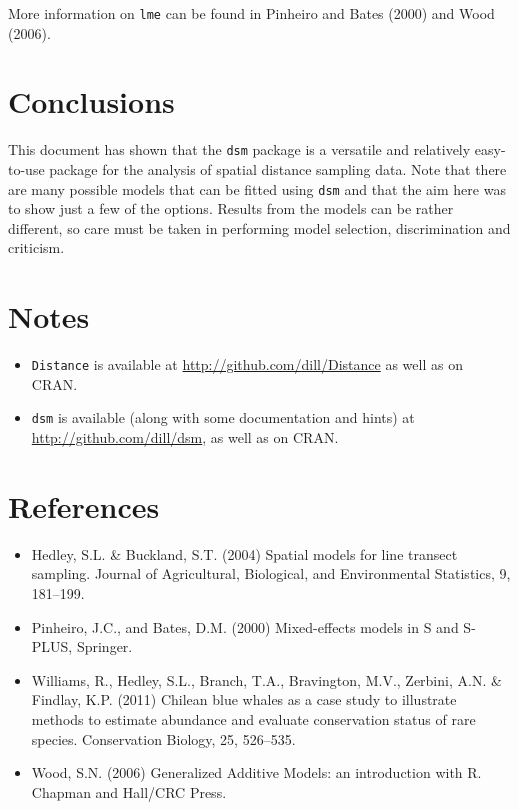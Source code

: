 \documentclass[]{amsart}
\begin{document}
More information on \texttt{lme} can be found in Pinheiro and Bates
(2000) and Wood (2006).

\section{Conclusions}

This document has shown that the \texttt{dsm} package is a versatile and
relatively easy-to-use package for the analysis of spatial distance
sampling data. Note that there are many possible models that can be
fitted using \texttt{dsm} and that the aim here was to show just a few
of the options. Results from the models can be rather different, so care
must be taken in performing model selection, discrimination and
criticism.

\section*{Notes}

\begin{itemize}
\itemsep1pt\parskip0pt
\item
  \texttt{Distance} is available at
  \url{http://github.com/dill/Distance} as well as on CRAN.
\item
  \texttt{dsm} is available (along with some documentation and hints) at
  \url{http://github.com/dill/dsm}, as well as on CRAN.
\end{itemize}

\section*{References}

\begin{itemize}
\itemsep1pt\parskip0pt
\item
  Hedley, S.L. \& Buckland, S.T. (2004) Spatial models for line transect
  sampling. Journal of Agricultural, Biological, and Environmental
  Statistics, 9, 181--199.
\item
  Pinheiro, J.C., and Bates, D.M. (2000) Mixed-effects models in S and
  S-PLUS, Springer.
\item
  Williams, R., Hedley, S.L., Branch, T.A., Bravington, M.V., Zerbini,
  A.N. \& Findlay, K.P. (2011) Chilean blue whales as a case study to
  illustrate methods to estimate abundance and evaluate conservation
  status of rare species. Conservation Biology, 25, 526--535.
\item
  Wood, S.N. (2006) Generalized Additive Models: an introduction with R.
  Chapman and Hall/CRC Press.
\end{itemize}
\end{document}
